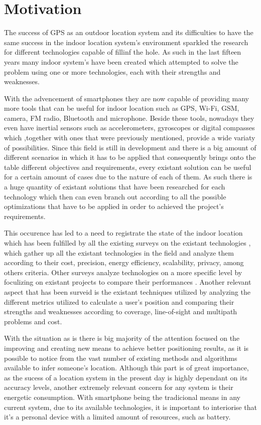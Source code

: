\section{Motivation}
\label{sec:int_motivation}

The success of \ac{GPS} as an outdoor location system and its difficulties to have the same success in the indoor location system's environment sparkled the research for different technologies capable of fillinf the hole. As such in the last fifteen years many indoor system's have been created which attempted to solve the problem using one or more technologies, each with their strengths and weaknesses. 

With the advencement of smartphones they are now capable of providing many more tools that can be useful for indoor location such as GPS, Wi-Fi, GSM, camera, FM radio, Bluetooth and microphone. Beside these tools, nowadays they even have inertial sensors such as accelerometers, gyroscopes or digital compasses which ,together with ones that were previously mentioned, provide a wide variaty of possibilities. Since this field is still in development and there is a big amount of different scenarios in which it has to be applied that consequently brings onto the table different objectives and requirements, every existant solution can be useful for a certain amount of cases due to the nature of each of them. As such there is a huge quantity of existant solutions that have been researched for each technology which then can even branch out according to all the possible optimizations that have to be applied in order to achieved the project's requirements.

This occurence has led to a need to registrate the state of the indoor location which has been fulfilled by all the existing surveys on the existant technologies \cite{survey1, surveythesis}, which gather up all the existant technologies in the field and analyze them according to their cost, precision, energy efficiency, scalability, privacy, among others criteria. Other surveys analyze technologies on a more specific level by foculizing on existant projects to compare their performances \cite{surveywireless}. Another relevant aspect that has been surveid is the existant techniques utilized \cite{reviewtechniques, survey2} by analyzing the different metrics utilized to calculate a user's position and comparing their strengths and weaknesses according to coverage, line-of-sight and multipath problems and cost.  

With the situation as is there is big majority of the attention focused on the improving and creating new means to achieve better positioning results, as it is possible to notice from the vast number of existing methods and algorithms available to infer someone's location. Although this part is of great importance, as the sucess of a location system in the present day is highly dependant on its accuracy levels, another extremely relevant concern for any system is their energetic consumption. With smartphone being the tradicional means in any current system, due to its available technologies, it is important to interiorise that it's a personal device with a limited amount of resources, such as battery. 

